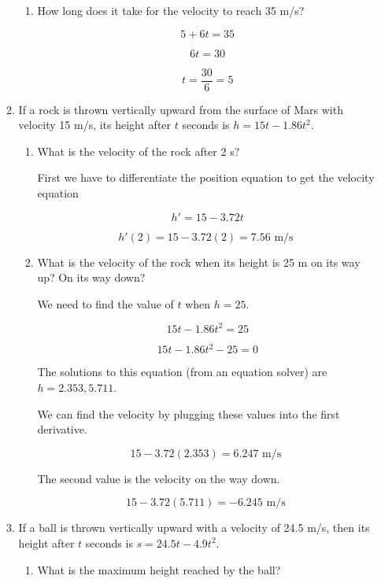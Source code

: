 \documentclass{article}
\begin{document}
\begin{enumerate}
\begin{enumerate}
\begin{enumerate}
				\item How long does it take for the velocity to reach 35 m/s?

					$$5 + 6t = 35$$

					$$6t = 30$$

					$$t = \frac{30}{6} = 5$$
			\end{enumerate}

			\item If a rock is thrown vertically upward from the surface of Mars with
				velocity 15 m/s, its height after $t$ seconds is $h = 15t - 1.86t^2$.

				\begin{enumerate}
					\item What is the velocity of the rock after 2 s?

						First we have to differentiate the position equation to
						get the velocity equation

						$$h' = 15 - 3.72t$$

						$$h'(2) = 15 - 3.72(2) = 7.56 \text{ m/s }$$

					\item What is the velocity of the rock when its height is 25 m
						on its way up? On its way down?

						We need to find the value of $t$ when $h = 25$.

						$$15t - 1.86t^2 = 25$$

						$$15t - 1.86t^2 - 25 = 0$$

						The solutions to this equation (from an equation solver)
						are $h = 2.353, 5.711$.

						We can find the velocity by plugging these values into the 
						first derivative.

						$$15 - 3.72(2.353) = 6.247 \text{ m/s }$$

						The second value is the velocity on the way down.

						$$15 - 3.72(5.711) = -6.245 \text{ m/s }$$

				\end{enumerate}

		\item If a ball is thrown vertically upward with a velocity of 24.5 m/s, then its height
			after $t$ seconds is $s = 24.5t - 4.9t^2$.

				\begin{enumerate}

					\item What is the maximum height reached by the ball?


\end{enumerate}
\end{enumerate}
\end{enumerate}
\end{document}
